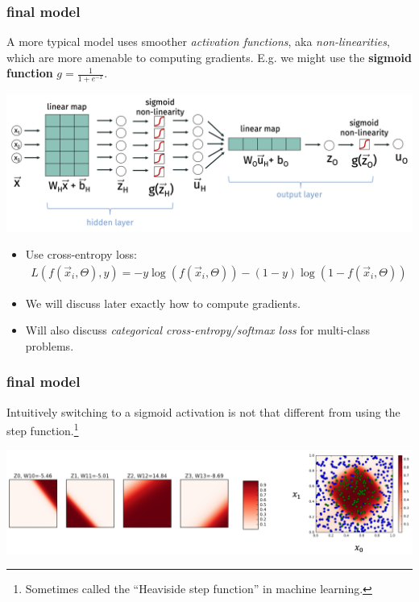 \documentclass[handout,compress]{beamer}
\begin{document}
\begin{frame}
	\frametitle{final model}
	\small
	A more typical model uses smoother \emph{activation functions}, aka \emph{non-linearities}, which are more amenable to computing gradients. E.g. we might use the \textbf{sigmoid function} $g = \frac{1}{1 +e^{-x}}$. 
	\vspace{-1em}
	\begin{center}
		\includegraphics[width=\textwidth]{sigmoid_activation.png}
	\end{center}
\vspace{-2em}
	\begin{itemize}
		\small
		\item Use cross-entropy loss: 
		\begin{align*}
		L(f(\vec{x}_i, \Theta), y) = -y\log(f(\vec{x}_i, \Theta)) - (1-y)\log(1 - f(\vec{x}_i, \Theta))
		\end{align*}
		\item We will discuss later exactly how to compute gradients. 
		\item Will also discuss \emph{categorical cross-entropy/softmax loss} for multi-class problems.
	\end{itemize}
\end{frame}

\begin{frame}
	\frametitle{final model}
	Intuitively switching to a sigmoid activation is not that different from using the step function.\footnote{Sometimes called the ``Heaviside step function'' in machine learning.}
	\begin{center}
		\includegraphics[width=\textwidth]{soft_class.png}
	\end{center}
\end{frame}
\end{document}
